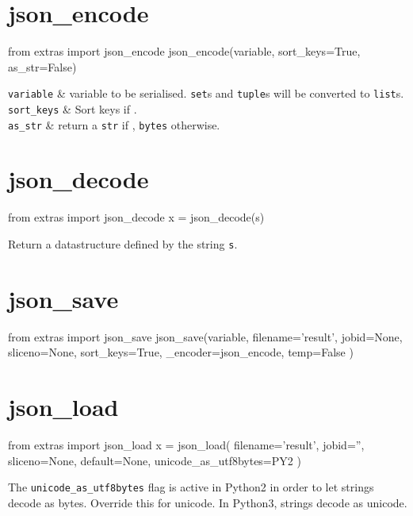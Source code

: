 \section{json\_encode}
\begin{python}
from extras import json_encode
json_encode(variable, sort_keys=True, as_str=False)
\end{python}

\starttabletwo
\RPtwo \texttt{variable} & variable to be serialised.  \texttt{set}s and
\texttt{tuple}s will be converted to \texttt{list}s.\\[1ex]

\RPtwo \texttt{sort\_keys} & Sort keys if \pyTrue.\\[1ex]

\RPtwo \texttt{as\_str} & return a \texttt{str} if \pyTrue, \texttt{bytes}
otherwise.
\stoptabletwo



\section{json\_decode}
\begin{python}
from extras import json_decode
x = json_decode(s)
\end{python}
Return a datastructure defined by the string \texttt{s}.




\section{json\_save}
\begin{python}
from extras import json_save
json_save(variable,
    filename='result',
    jobid=None,
    sliceno=None,
    sort_keys=True,
    _encoder=json_encode,
    temp=False
)
\end{python}




\section{json\_load}
\begin{python}
from extras import json_load
x = json_load(
    filename='result',
    jobid='',
    sliceno=None,
    default=None,
    unicode_as_utf8bytes=PY2
)
\end{python}
The \texttt{unicode\_as\_utf8bytes} flag is active in Python2 in order
to let strings decode as bytes.  Override this for unicode.  In
Python3, strings decode as unicode.





